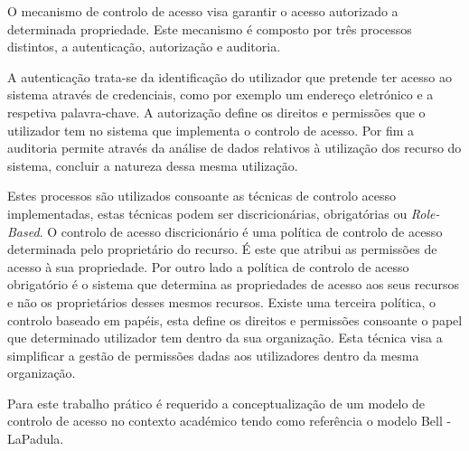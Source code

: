 \documentclass[../tp2.tex]{subfiles}
\begin{document}
O mecanismo de controlo de acesso visa garantir o acesso autorizado a determinada propriedade. Este mecanismo é composto por três processos distintos, a autenticação, autorização e auditoria.\par 
A autenticação trata-se da identificação do utilizador que pretende ter acesso ao sistema através de credenciais, como por exemplo um endereço eletrónico e a respetiva palavra-chave. A autorização define os direitos e permissões que o utilizador tem no sistema que implementa o controlo de acesso. Por fim a auditoria permite através da análise de dados relativos à utilização dos recurso do sistema, concluir a natureza dessa mesma utilização.\par 
Estes processos são utilizados consoante as técnicas de controlo acesso implementadas, estas técnicas podem ser discricionárias, obrigatórias ou \textit{Role-Based}. O controlo de acesso discricionário é uma política de controlo de acesso determinada pelo proprietário do recurso. É este que atribui as permissões de acesso à sua propriedade. Por outro lado a política de controlo de acesso obrigatório é o sistema que determina as propriedades de acesso aos seus recursos e não os proprietários desses mesmos recursos. Existe uma terceira política, o controlo baseado em papéis, esta define os direitos e permissões consoante o papel que determinado utilizador tem dentro da sua organização. Esta técnica visa a simplificar a gestão de permissões dadas aos utilizadores dentro da mesma organização.\par 
Para este trabalho prático é requerido a conceptualização de um modelo de controlo de acesso no contexto académico tendo como referência o modelo Bell - LaPadula.
\end{document}
